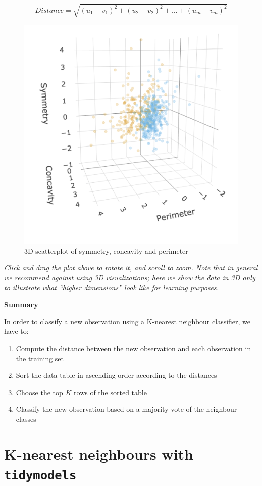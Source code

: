 \documentclass[
]{krantz}
\providecommand{\tightlist}{%
  \setlength{\itemsep}{0pt}\setlength{\parskip}{0pt}}
\begin{document}
\[Distance = \sqrt{(u_{1} -v_{1})^2 + (u_{2} - v_{2})^2 + \dots + (u_{m} - v_{m})^2}\]

\begin{figure}
\includegraphics[width=0.7\linewidth]{img/classification_3d} \caption{3D scatterplot of symmetry, concavity and perimeter}\label{fig:05-more}
\end{figure}

\emph{Click and drag the plot above to rotate it, and scroll to zoom. Note that in
general we recommend against using 3D visualizations; here we show the data in
3D only to illustrate what ``higher dimensions'' look like for learning
purposes.}

\textbf{Summary}

In order to classify a new observation using a K-nearest neighbour classifier, we have to:

\begin{enumerate}
\def\labelenumi{\arabic{enumi}.}
\tightlist
\item
  Compute the distance between the new observation and each observation in the training set
\item
  Sort the data table in ascending order according to the distances
\item
  Choose the top \(K\) rows of the sorted table
\item
  Classify the new observation based on a majority vote of the neighbour classes
\end{enumerate}

\hypertarget{k-nearest-neighbours-with-tidymodels}{%
\section{\texorpdfstring{K-nearest neighbours with \texttt{tidymodels}}{K-nearest neighbours with tidymodels}}\label{k-nearest-neighbours-with-tidymodels}}
\end{document}
